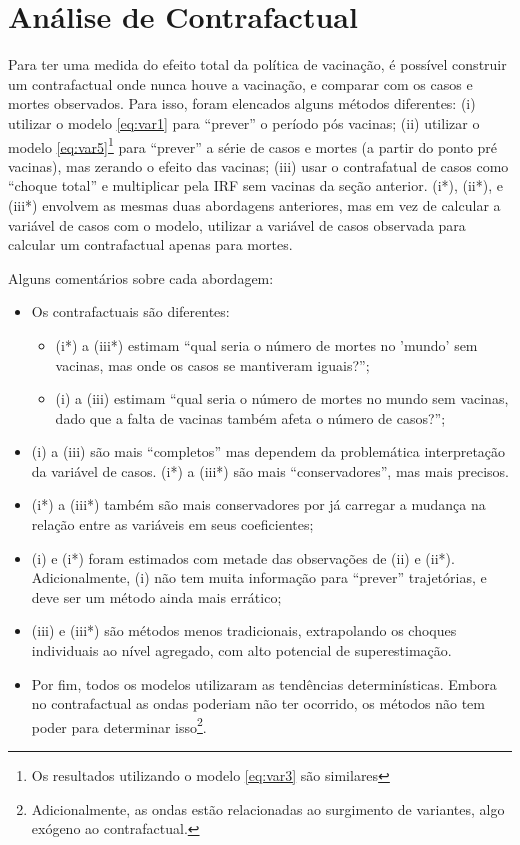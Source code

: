 \documentclass[
    article,
	12pt,				%
	oneside,			%
	a4paper,			%
	english,			%
	brazil,				%
	hyperref = {colorlinks, citecolor=c1d, linkcolor=c2d, urlcolor=c3d, colorlinks}
	]{abntex2}
\newcounter{j}
\begin{document}
\section{Análise de Contrafactual}\label{sec:res2}

Para ter uma medida do efeito total da política de vacinação, é possível construir um contrafactual onde nunca houve a vacinação, e comparar com os casos e mortes observados. Para isso, foram elencados alguns métodos diferentes: (i) utilizar o modelo \eqref{eq:var1} para ``prever'' o período pós vacinas; (ii) utilizar o modelo \eqref{eq:var5}\footnote{Os resultados utilizando o modelo \eqref{eq:var3} são similares} para ``prever'' a série de casos e mortes (a partir do ponto pré vacinas), mas zerando o efeito das vacinas; (iii) usar o contrafatual de casos como ``choque total'' e multiplicar pela IRF sem vacinas da seção anterior. (i*), (ii*), e (iii*) envolvem as mesmas duas abordagens anteriores, mas em vez de calcular a variável de casos com o modelo, utilizar a variável de casos observada para calcular um contrafactual apenas para mortes.

Alguns comentários sobre cada abordagem:

\begin{itemize}
    \item Os contrafactuais são diferentes:
    \begin{itemize}
    \item (i*) a (iii*) estimam ``qual seria o número de mortes no 'mundo' sem vacinas, mas onde os casos se mantiveram iguais?'';
    \item (i) a (iii) estimam ``qual seria o número de mortes no mundo sem vacinas, dado que a falta de vacinas também afeta o número de casos?'';
\end{itemize}
    \item (i) a (iii) são mais ``completos'' mas dependem da problemática interpretação da variável de casos. (i*) a (iii*) são mais ``conservadores'', mas mais precisos.
    \item (i*) a (iii*) também são mais conservadores por já carregar a mudança na relação entre as variáveis em seus coeficientes;
    \item (i) e (i*) foram estimados com metade das observações de (ii) e (ii*). Adicionalmente, (i) não tem muita informação para ``prever'' trajetórias, e deve ser um método ainda mais errático;
    \item (iii) e (iii*) são métodos menos tradicionais, extrapolando os choques individuais ao nível agregado, com alto potencial de superestimação.
    \item Por fim, todos os modelos utilizaram as tendências determinísticas. Embora no contrafactual as ondas poderiam não ter ocorrido, os métodos não tem poder para determinar isso\footnote{Adicionalmente, as ondas estão relacionadas ao surgimento de variantes, algo exógeno ao contrafactual.}.
\end{itemize}
\end{document}
